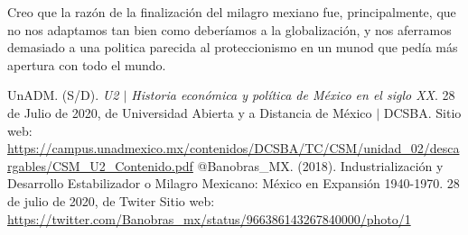 \documentclass[12pt]{article}
\begin{document}
\par Creo que la razón de la finalización del milagro mexiano fue, principalmente, que no nos adaptamos tan bien como deberíamos a la globalización, y nos aferramos demasiado a una politica parecida al proteccionismo en un munod que pedía más apertura con todo el mundo.






\newpage
\begin{thebibliography}{X}
	 UnADM. (S/D). \textit{U2 $|$ Historia econ\'omica y pol\'itica de M\'exico en el siglo XX}. 28 de Julio de 2020, de Universidad Abierta y a Distancia de M\'exico $|$ DCSBA. Sitio web: \url{https://campus.unadmexico.mx/contenidos/DCSBA/TC/CSM/unidad_02/descargables/CSM_U2_Contenido.pdf} 
	 @Banobras\_MX. (2018). Industrialización y Desarrollo Estabilizador o Milagro Mexicano: México en Expansión 1940-1970. 28 de julio de 2020, de Twiter Sitio web: \url{https://twitter.com/Banobras_mx/status/966386143267840000/photo/1}
	
\end{thebibliography}
\end{document}
